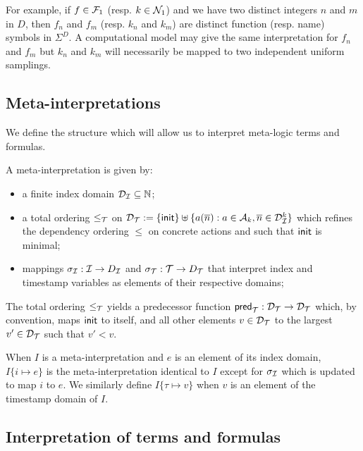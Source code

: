 For example, if $f \in \mathcal{F}_1$ (resp. $k \in \mathcal{N}_1$) and we have two distinct
integers $n$ and $m$ in $D$, then $f_n$ and $f_m$ (resp. $k_n$ and $k_m$)
are distinct function (resp. name) symbols in $\Sigma^D$.
A computational model may give the same interpretation for $f_n$ and $f_m$
but $k_n$ and $k_m$ will necessarily be mapped to two independent uniform
samplings.

\subsection{Meta-interpretations}

We define the structure which will allow us to interpret meta-logic
terms and formulas.

\begin{definition}
  A meta-interpretation is given by:
  \begin{itemize}
    \item a finite index domain $\mathcal{D}_{\mathcal{I}} \subseteq \mathbb{N}$;
    \item a total ordering $\leq_{\mathcal{T}}$ on
      $\mathcal{D}_{\mathcal{T}} := \{ \mathsf{init} \} \uplus \{ a(\overline{n}) : a\in\mathcal{A}_k,
      \overline{n}\in\mathcal{D}_{\mathcal{I}}^k \}$ which refines the dependency ordering
      $\leq$ on concrete actions and such that $\mathsf{init}$ is minimal;
    \item mappings $\sigma_{\mathcal{I}} : \mathcal{I} \to D_{\mathcal{I}}$
      and $\sigma_{\mathcal{T}} : \mathcal{T} \to D_{\mathcal{T}}$ that interpret index and
      timestamp variables as elements of their respective domains;
  \end{itemize}
\end{definition}

The total ordering $\leq_{\mathcal{T}}$ yields a predecessor function
$\mathsf{pred}_{\mathcal{T}} : \mathcal{D}_{\mathcal{T}}\to\mathcal{D}_{\mathcal{T}}$ which,
by convention, maps $\mathsf{init}$ to itself,
and all other elements $v \in \mathcal{D}_{\mathcal{T}}$ to the largest $v' \in \mathcal{D}_{\mathcal{T}}$ such that
$v' < v$.

When $I$ is a meta-interpretation and $e$ is an element of its index domain,
$I\{i\mapsto e\}$ is the meta-interpretation identical to $I$ except for
$\sigma_{\mathcal{I}}$ which is updated to map $i$ to $e$. We similarly define
$I\{\tau\mapsto v\}$ when $v$ is an element of the timestamp domain of $I$.

\subsection{Interpretation of terms and formulas}

\newcommand{\interp}[1]{(#1)}

